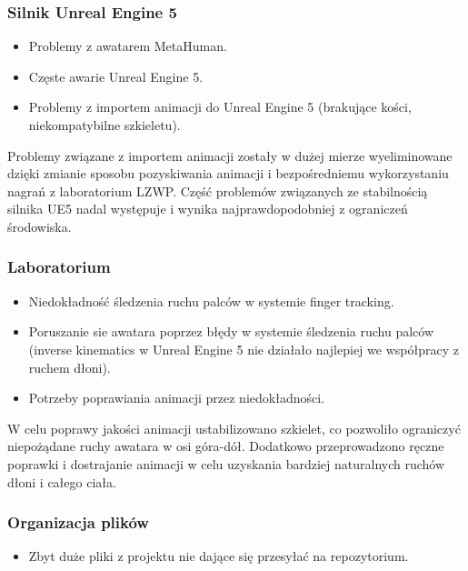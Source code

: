 \documentclass[12pt]{article}
\begin{document}
\subsubsection{Silnik Unreal Engine 5}

\begin{itemize}
    \item Problemy z awatarem MetaHuman. 
    \item Częste awarie Unreal Engine 5.
    \item Problemy z importem animacji do Unreal Engine 5 (brakujące kości, niekompatybilne szkieletu).
\end{itemize}

Problemy związane z importem animacji zostały w dużej mierze wyeliminowane dzięki zmianie sposobu pozyskiwania animacji i bezpośredniemu wykorzystaniu nagrań z laboratorium LZWP. Część problemów związanych ze stabilnością silnika UE5 nadal występuje i wynika najprawdopodobniej z ograniczeń środowiska.

\subsubsection{Laboratorium}

\begin{itemize}
    \item Niedokładność śledzenia ruchu palców w systemie finger tracking.
    \item Poruszanie sie awatara poprzez błędy w systemie śledzenia ruchu palców (inverse kinematics w Unreal Engine 5 nie działało najlepiej we współpracy z ruchem dłoni).
    \item Potrzeby poprawiania animacji przez niedokładności.
\end{itemize}
W celu poprawy jakości animacji ustabilizowano szkielet, co pozwoliło ograniczyć niepożądane ruchy awatara w osi góra-dół. Dodatkowo przeprowadzono ręczne poprawki i dostrajanie animacji w celu uzyskania bardziej naturalnych ruchów dłoni i całego ciała.

\subsubsection{Organizacja plików}

\begin{itemize}
    \item Zbyt duże pliki z projektu nie dające się przesyłać na repozytorium.
\end{itemize}
\end{document}
